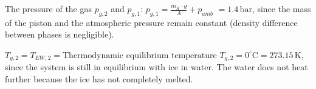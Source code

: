 The pressure of the gas \( p_{g,2} \) and \( p_{g,1} \):  
\( p_{g,1} = \frac{m_K \cdot g}{A} + p_{amb} \)  
\( = 1.4 \, \text{bar} \), since the mass of the piston and the atmospheric pressure remain constant (density difference between phases is negligible).  

\( T_{g,2} = T_{EW,2} = \text{Thermodynamic equilibrium temperature} \)  
\( T_{g,2} = 0^\circ \text{C} = 273.15 \, \text{K} \), since the system is still in equilibrium with ice in water. The water does not heat further because the ice has not completely melted.